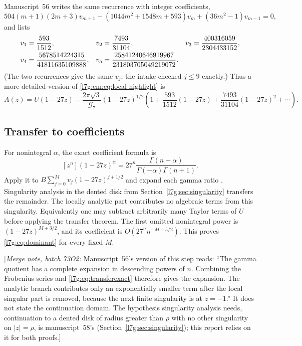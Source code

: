 \documentclass[11pt,letterpaper]{article}
\theoremstyle{remark}\newtheorem{remark}[theorem]{Remark}
\newcommand{\G}{\mathcal G_7}\newcommand{\Ast}{A_\star}
\newcommand{\mergenote}[1]{\textup{[}\emph{Merge note, batch 73O2:} #1\textup{]}}
\newcounter{l7gtrsavedeq}
\begin{document}
Manuscript~56 writes the same recurrence with integer coefficients,
\begin{equation}\label{l7g:cm:eq:b-recurrence}
 504(m+1)(2m+3)v_{m+1}
 -(1044m^2+1548m+593)v_m
 +(36m^2-1)v_{m-1}=0,
\end{equation}
and lists
\begin{align}
 v_1&=\frac{593}{1512},&
 v_2&=\frac{7493}{31104},&
 v_3&=\frac{400316059}{2304433152},\notag\\
 v_4&=\frac{5678514224315}{41811635109888},&
 v_5&=\frac{25841240646919967}{231803705049219072}.
 \label{l7g:cm:eq:b-values}
\end{align}
(The two recurrences give the same $v_j$; the intake checked $j\le9$
exactly.) Thus a more detailed version of
\eqref{l7g:cm:eq:local-highlight} is
\begin{equation}\label{l7g:cm:eq:local-detailed}
 A(z)=U(1-27z)
 -\frac{2\pi\sqrt3}{\G}(1-27z)^{1/2}
 \left(1+\frac{593}{1512}(1-27z)
 +\frac{7493}{31104}(1-27z)^2+\cdots\right).
\end{equation}

\subsection{Transfer to coefficients}\label{l7g:sec:transfer}
For nonintegral $\alpha$, the exact coefficient formula is
\begin{equation}\label{l7g:eq:transferexact}
 [z^n](1-27z)^\alpha
 =27^n\frac{\Gamma(n-\alpha)}{\Gamma(-\alpha)\Gamma(n+1)}.
\end{equation}
Apply it to $B\sum_{j=0}^M v_j(1-27z)^{j+1/2}$ and expand each gamma
ratio \cite[\S5.11]{l7g:dlmf}. Singularity analysis in the dented disk from
Section~\ref{l7g:sec:singularity} transfers the remainder. The locally
analytic part contributes no algebraic terms from this singularity.
Equivalently one may subtract arbitrarily many Taylor terms of $U$ before
applying the transfer theorem. The first omitted nonintegral power is
$(1-27z)^{M+3/2}$, and its coefficient is $O(27^nn^{-M-5/2})$. This proves
\eqref{l7g:eq:dominant} for every fixed $M$.

\mergenote{Manuscript~56's version of this step reads: ``The gamma
quotient has a complete expansion in descending powers of $n$. Combining
the Frobenius series and \eqref{l7g:eq:transferexact} therefore gives the
expansion. The analytic branch contributes only an exponentially smaller
term after the local singular part is removed, because the next finite
singularity is at $z=-1$.'' It does not state the continuation domain.
The hypothesis singularity analysis needs, continuation to a dented disk
of radius greater than $\rho$ with no other singularity on $|z|=\rho$, is
manuscript~58's (Section~\ref{l7g:sec:singularity}); this report relies
on it for both proofs.}
\end{document}
